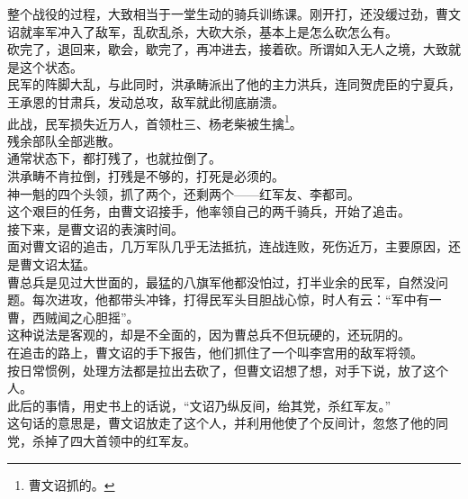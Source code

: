 \begin{multicols}{\theparacolNo}
整个战役的过程，大致相当于一堂生动的骑兵训练课。刚开打，还没缓过劲，曹文诏就率军冲入了敌军，乱砍乱杀，大砍大杀，基本上是怎么砍怎么有。\\

砍完了，退回来，歇会，歇完了，再冲进去，接着砍。所谓如入无人之境，大致就是这个状态。\\

民军的阵脚大乱，与此同时，洪承畴派出了他的主力洪兵，连同贺虎臣的宁夏兵，王承恩的甘肃兵，发动总攻，敌军就此彻底崩溃。\\

此战，民军损失近万人，首领杜三、杨老柴被生擒\footnote{曹文诏抓的。}。\\

残余部队全部逃散。\\

通常状态下，都打残了，也就拉倒了。\\

洪承畴不肯拉倒，打残是不够的，打死是必须的。\\

神一魁的四个头领，抓了两个，还剩两个——红军友、李都司。\\

这个艰巨的任务，由曹文诏接手，他率领自己的两千骑兵，开始了追击。\\

接下来，是曹文诏的表演时间。\\

面对曹文诏的追击，几万军队几乎无法抵抗，连战连败，死伤近万，主要原因，还是曹文诏太猛。\\

曹总兵是见过大世面的，最猛的八旗军他都没怕过，打半业余的民军，自然没问题。每次进攻，他都带头冲锋，打得民军头目胆战心惊，时人有云：“军中有一曹，西贼闻之心胆摇”。\\

这种说法是客观的，却是不全面的，因为曹总兵不但玩硬的，还玩阴的。\\

在追击的路上，曹文诏的手下报告，他们抓住了一个叫李宫用的敌军将领。\\

按日常惯例，处理方法都是拉出去砍了，但曹文诏想了想，对手下说，放了这个人。\\

此后的事情，用史书上的话说，“文诏乃纵反间，绐其党，杀红军友。”\\

这句话的意思是，曹文诏放走了这个人，并利用他使了个反间计，忽悠了他的同党，杀掉了四大首领中的红军友。\\


\end{multicols}
